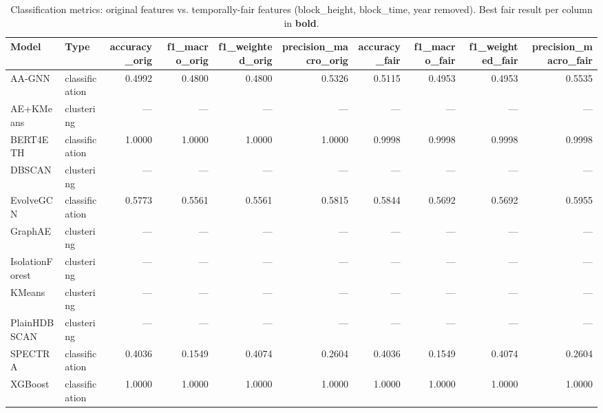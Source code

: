 \begin{table}[!t]
\centering
\caption{Classification metrics: original features vs. temporally-fair features (block\_height, block\_time, year removed). Best fair result per column in \textbf{bold}.}
\label{tab:combined_comparison}
\renewcommand{\arraystretch}{1.1}
\begin{tabular}{llrrrrrrrr}
\toprule
Model & Type & accuracy_orig & f1_macro_orig & f1_weighted_orig & precision_macro_orig & accuracy_fair & f1_macro_fair & f1_weighted_fair & precision_macro_fair \\
\midrule
AA-GNN & classification & 0.4992 & 0.4800 & 0.4800 & 0.5326 & 0.5115 & 0.4953 & 0.4953 & 0.5535 \\
AE+KMeans & clustering & --- & --- & --- & --- & --- & --- & --- & --- \\
BERT4ETH & classification & 1.0000 & 1.0000 & 1.0000 & 1.0000 & 0.9998 & 0.9998 & 0.9998 & 0.9998 \\
DBSCAN & clustering & --- & --- & --- & --- & --- & --- & --- & --- \\
EvolveGCN & classification & 0.5773 & 0.5561 & 0.5561 & 0.5815 & 0.5844 & 0.5692 & 0.5692 & 0.5955 \\
GraphAE & clustering & --- & --- & --- & --- & --- & --- & --- & --- \\
IsolationForest & clustering & --- & --- & --- & --- & --- & --- & --- & --- \\
KMeans & clustering & --- & --- & --- & --- & --- & --- & --- & --- \\
PlainHDBSCAN & clustering & --- & --- & --- & --- & --- & --- & --- & --- \\
SPECTRA & classification & 0.4036 & 0.1549 & 0.4074 & 0.2604 & 0.4036 & 0.1549 & 0.4074 & 0.2604 \\
XGBoost & classification & 1.0000 & 1.0000 & 1.0000 & 1.0000 & 1.0000 & 1.0000 & 1.0000 & 1.0000 \\
\bottomrule
\end{tabular}
\end{table}